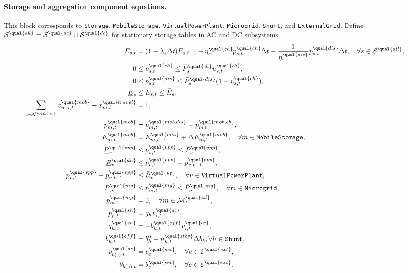 \paragraph{Storage and aggregation component equations.}
This block corresponds to \texttt{Storage}, \texttt{MobileStorage},
\texttt{VirtualPowerPlant}, \texttt{Microgrid}, \texttt{Shunt}, and
\texttt{ExternalGrid}.
Define \(\mathcal{S}^{\qual{all}}=\mathcal{S}^{\qual{ac}}\cup\mathcal{S}^{\qual{dc}}\)
for stationary storage tables in AC and DC subsystems.
\begin{align}
E_{s,t}&=(1-\lambda_s\Delta t)E_{s,t-1}
+\eta^{\qual{ch}}_s p^{\qual{ch}}_{s,t}\Delta t
-\frac{1}{\eta^{\qual{dis}}_s}p^{\qual{dis}}_{s,t}\Delta t,
\quad \forall s\in\mathcal{S}^{\qual{all}},
\label{eq:tstr-comp-storage}
\\
0&\le p^{\qual{ch}}_{s,t}\le \bar P^{\qual{ch}}_s u^{\qual{ch}}_{s,t},
\notag
\\
0&\le p^{\qual{dis}}_{s,t}\le \bar P^{\qual{dis}}_s (1-u^{\qual{ch}}_{s,t}),
\notag
\\
\underline E_s&\le E_{s,t}\le \bar E_s,
\notag
\\
\sum_{i\in\mathcal{N}^{\qual{ac}}}x^{\qual{mob}}_{m,i,t}+x^{\qual{travel}}_{m,t}&=1,
\notag\\
p^{\qual{mob}}_{m,t}&=p^{\qual{mob,dis}}_{m,t}-p^{\qual{mob,ch}}_{m,t},
\notag\\
E^{\qual{mob}}_{m,t}&=E^{\qual{mob}}_{m,t-1}+\Delta E^{\qual{mob}}_{m,t},
\quad \forall m\in\texttt{MobileStorage},
\label{eq:tstr-comp-mobile}
\\
\underline P^{\qual{vpp}}_v&\le p^{\qual{vpp}}_{v,t}\le \bar P^{\qual{vpp}}_v,
\notag\\
\underline R^{\qual{dn}}_v&\le p^{\qual{vpp}}_{v,t}-p^{\qual{vpp}}_{v,t-1},
\notag\\
p^{\qual{vpp}}_{v,t}-p^{\qual{vpp}}_{v,t-1}&\le \bar R^{\qual{up}}_v,
\quad \forall v\in\texttt{VirtualPowerPlant},
\label{eq:tstr-comp-vpp}
\\
\underline P^{\qual{mg}}_m&\le p^{\qual{mg}}_{m,t}\le \bar P^{\qual{mg}}_m,
\quad \forall m\in\texttt{Microgrid},
\notag\\
p^{\qual{mg}}_{m,t}&=0,\quad \forall m\in\mathcal{M}^{\qual{isl}}_t,
\label{eq:tstr-comp-microgrid}
\\
p^{\qual{sh}}_{h,t}&=g_h v^{\qual{ac}}_{i,t},
\notag\\
q^{\qual{sh}}_{h,t}&=-b^{\qual{eff}}_{h,t} v^{\qual{ac}}_{i,t},
\notag\\
b^{\qual{eff}}_{h,t}&=b_h^{0}+n^{\qual{step}}_{h,t}\Delta b_h,
\forall h\in\texttt{Shunt},
\label{eq:tstr-comp-shunt}
\\
v^{\qual{ac}}_{b(e),t}&=v^{\qual{set}}_{e},
\quad \forall e\in\mathcal{E}^{\qual{ext}},
\notag\\
\theta_{b(e),t}&=\theta^{\qual{set}}_{e},
\quad \forall e\in\mathcal{E}^{\qual{ext}}.
\label{eq:tstr-comp-extgrid}
\end{align}

